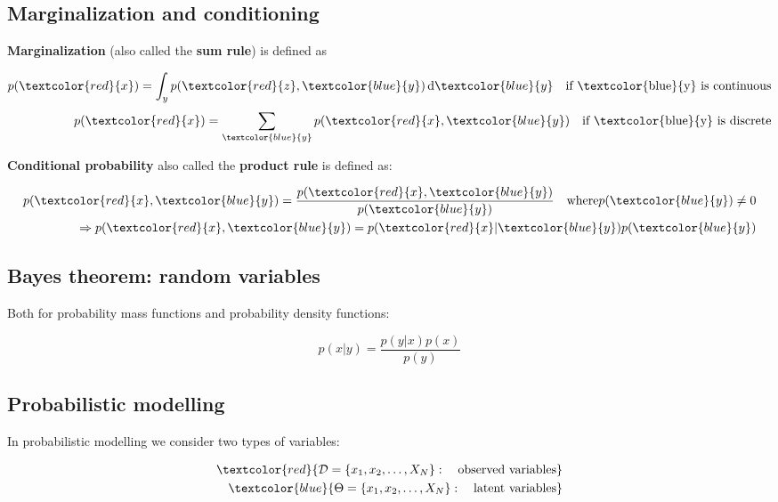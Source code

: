 \subsection{Marginalization and conditioning}
\textbf{Marginalization} (also called the \textbf{sum rule}) is defined as 

\begin{equation}
\begin{aligned}
    p(\textcolor{red}{x}) = \int_{y} p(\textcolor{red}{z},\textcolor{blue}{y}) \,\text{d}\textcolor{blue}{y} \quad \text{if \textcolor{blue}{y} is continuous} \\
    p(\textcolor{red}{x}) = \sum_{\textcolor{blue}{y}}^{} p(\textcolor{red}{x}, \textcolor{blue}{y}) \quad \text{if \textcolor{blue}{y} is discrete}
\end{aligned}
\end{equation}

\textbf{Conditional probability} also called the \textbf{product rule} is defined as:

\begin{equation}
\begin{aligned}
    p(\textcolor{red}{x}, \textcolor{blue}{y}) = \frac{p(\textcolor{red}{x}, \textcolor{blue}{y})} {p(\textcolor{blue}{y})} \quad \text{where} p(\textcolor{blue}{y}) \neq 0  \\
    \Rightarrow p(\textcolor{red}{x}, \textcolor{blue}{y}) = p(\textcolor{red}{x}| \textcolor{blue}{y})p(\textcolor{blue}{y})
\end{aligned}
\end{equation}

\subsection{Bayes theorem: random variables}
Both for probability mass functions and probability density functions:

\begin{equation}
    p(x|y) = \frac{p(y|x)p(x)} {p(y)} 
\end{equation}



\subsection{Probabilistic modelling}
In probabilistic modelling we consider two types of variables:

\begin{equation}
\begin{aligned}
    \textcolor{red}{\mathcal{D} = \{x_1,x_2, \dots, X_N \}: \quad \text{observed variables}} \\ 
    \textcolor{blue}{\Theta = \{x_1,x_2, \dots, X_N \}: \quad \text{latent variables}}
\end{aligned}
\end{equation}

